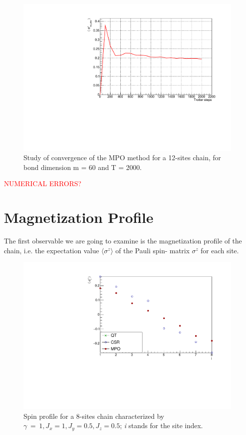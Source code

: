 \begin{figure}[H]
    \centering
    \includegraphics[scale=0.7]{Figures/12sites/ConvergenceLML012m060Time002000_J10505.pdf}
    \caption{Study of convergence of the MPO method for a 12-sites chain, for bond dimension m = 60 and T = 2000.}
    \label{fig:my_label}
\end{figure}

\textcolor{red}{NUMERICAL ERRORS?}

\section{Magnetization Profile}
The first observable we are going to examine is the magnetization profile of the chain, i.e. the expectation value $\langle \sigma^z \rangle$ of the Pauli spin- matrix $\sigma^z$ for each site. 

\begin{figure}[H]
    \centering
    \includegraphics[scale=0.7]{Figures/8sites_comparison/LMComparison_8sJ10505.pdf}
    \caption{Spin profile for a 8-sites chain characterized by $\gamma~=~1, J_x=1, J_y=0.5, J_z=0.5$; \emph{i} stands for the site index.}
    \label{fig:8sites_LMcomparisonJz05}
\end{figure}

